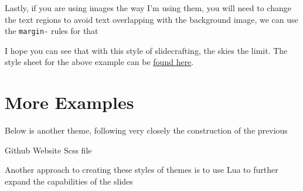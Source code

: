 \documentclass[
  letterpaper,
  DIV=11,
  numbers=noendperiod]{scrreprt}
\newenvironment{Shaded}{\begin{snugshade}}{\end{snugshade}}
\newcommand{\CommentTok}[1]{\textcolor[rgb]{0.37,0.37,0.37}{#1}}
\newcommand{\DataTypeTok}[1]{\textcolor[rgb]{0.68,0.00,0.00}{#1}}
\newcommand{\DecValTok}[1]{\textcolor[rgb]{0.68,0.00,0.00}{#1}}
\newcommand{\FunctionTok}[1]{\textcolor[rgb]{0.28,0.35,0.67}{#1}}
\newcommand{\ImportTok}[1]{\textcolor[rgb]{0.00,0.46,0.62}{#1}}
\newcommand{\InformationTok}[1]{\textcolor[rgb]{0.37,0.37,0.37}{#1}}
\newcommand{\KeywordTok}[1]{\textcolor[rgb]{0.00,0.23,0.31}{\textbf{#1}}}
\newcommand{\NormalTok}[1]{\textcolor[rgb]{0.00,0.23,0.31}{#1}}
\newcommand{\OperatorTok}[1]{\textcolor[rgb]{0.37,0.37,0.37}{#1}}
\newcommand{\StringTok}[1]{\textcolor[rgb]{0.13,0.47,0.30}{#1}}
\newcommand{\VariableTok}[1]{\textcolor[rgb]{0.07,0.07,0.07}{#1}}
\begin{document}
Lastly, if you are using images the way I'm using them, you will need to
change the text regions to avoid text overlapping with the background
image, we can use the \texttt{margin-} rules for that

\begin{Shaded}
\end{Shaded}

I hope you can see that with this style of slidecrafting, the skies the
limit. The style sheet for the above example can be
\href{https://github.com/EmilHvitfeldt/quarto-revealjs-earth/blob/main/_extensions/earth/earth.scss}{found
here}.

\section{More Examples}\label{more-examples}

Below is another theme, following very closely the construction of the
previous

 Github  Website  Scss
file

Another approach to creating these styles of themes is to use Lua to
further expand the capabilities of the slides
\end{document}

